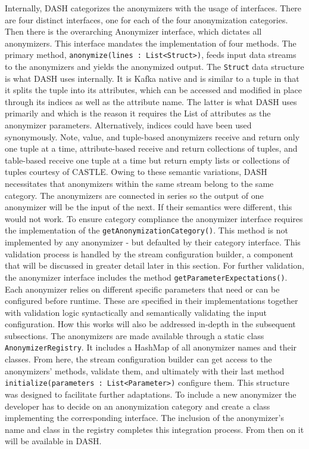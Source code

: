 Internally, \ac{DASH} categorizes the anonymizers with the usage of interfaces. There are four distinct interfaces, one for each of the four anonymization categories. Then there is the overarching Anonymizer interface, which dictates all anonymizers. This interface mandates the implementation of four methods. The primary method, \texttt{anonymize(lines : List<Struct>)}, feeds input data streams to the anonymizers and yields the anonymized output. The \texttt{Struct} data structure is what \ac{DASH} uses internally. It is Kafka native and is similar to a tuple in that it splits the tuple into its attributes, which can be accessed and modified in place through its indices as well as the attribute name. The latter is what \ac{DASH} uses primarily and which is the reason it requires the List of attributes as the anonymizer parameters. Alternatively, indices could have been used synonymously. Note, value, and tuple-based anonymizers receive and return only one tuple at a time, attribute-based receive and return collections of tuples, and table-based receive one tuple at a time but return empty lists or collections of tuples courtesy of CASTLE. Owing to these semantic variations, \ac{DASH} necessitates that anonymizers within the same stream belong to the same category. The anonymizers are connected in series so the output of one anonymizer will be the input of the next. If their semantics were different, this would not work. To ensure category compliance the anonymizer interface requires the implementation of the \texttt{getAnonymizationCategory()}. This method is not implemented by any anonymizer - but defaulted by their category interface. This validation process is handled by the stream configuration builder, a component that will be discussed in greater detail later in this section. For further validation, the anonymizer interface includes the method \texttt{getParameterExpectations()}. Each anonymizer relies on different specific parameters that need or can be configured before runtime. These are specified in their implementations together with validation logic syntactically and semantically validating the input configuration. How this works will also be addressed in-depth in the subsequent subsections. The anonymizers are made available through a static class \texttt{AnonymizerRegistry}. It includes a HashMap of all anonymizer names and their classes. From here, the stream configuration builder can get access to the anonymizers' methods, validate them, and ultimately with their last method \texttt{initialize(parameters : List<Parameter>)} configure them. This structure was designed to facilitate further adaptations. To include a new anonymizer the developer has to decide on an anonymization category and create a class implementing the corresponding interface. The inclusion of the anonymizer's name and class in the registry completes this integration process. From then on it will be available in \ac{DASH}.


